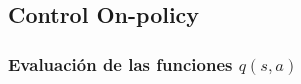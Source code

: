 \documentclass[10pt, envcountsect, handout, aspectratio=1610, hyperref={hypertexnames=true}]{beamer}
\begin{document}

\subsection{Control On-policy}





\subsubsection{Evaluación de las funciones $q(s,a)$}
\end{document}
